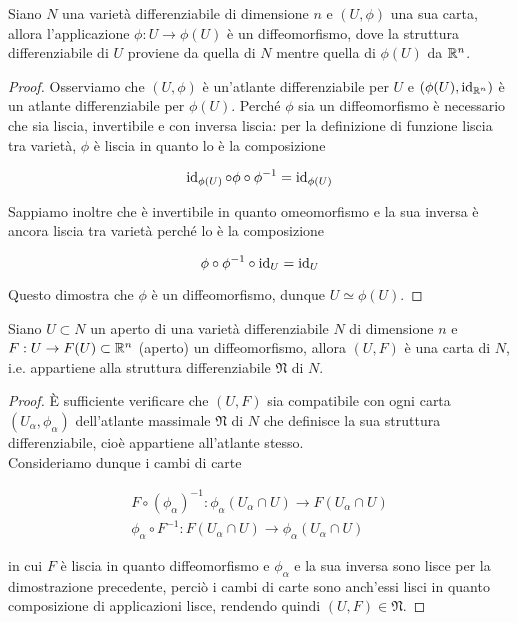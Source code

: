 \begin{definition}
	Siano $ N $ una varietà differenziabile di dimensione $ n $ e $ (U,\phi) $ una sua carta, allora l'applicazione $ \phi : U \to \phi(U) $ è un diffeomorfismo, dove la struttura differenziabile di $ U $ proviene da quella di $ N $ mentre quella di $ \phi(U) $ da $ \mathbb{R}^{n} $.
\end{definition}

\begin{proof}
	Osserviamo che $ (U,\phi) $ è un'atlante differenziabile per $ U $ e $ (\phi(U),\operatorname{id}_{\mathbb{R}^{n}}) $ è un atlante differenziabile per $ \phi(U) $. Perché $ \phi $ sia un diffeomorfismo è necessario che sia liscia, invertibile e con inversa liscia: per la definizione di funzione liscia tra varietà, $ \phi $ è liscia in quanto lo è la composizione
	
	\begin{equation}
		\operatorname{id}_{\phi(U)} \circ \phi \circ \phi^{-1} = \operatorname{id}_{\phi(U)}
	\end{equation}

	Sappiamo inoltre che è invertibile in quanto omeomorfismo e la sua inversa è ancora liscia tra varietà perché lo è la composizione
	
	\begin{equation}
		\phi \circ \phi^{-1} \circ \operatorname{id}_{U} = \operatorname{id}_{U}
	\end{equation}

	Questo dimostra che $ \phi $ è un diffeomorfismo, dunque $ U \simeq \phi(U) $.
\end{proof}

\begin{definition}\label{diffeo-map}
	Siano $ U \subset N $ un aperto di una varietà differenziabile $ N $ di dimensione $ n $ e $ F : U \to F(U) \subset \mathbb{R}^{n} $ (aperto) un diffeomorfismo, allora $ (U,F) $ è una carta di $ N $, i.e. appartiene alla struttura differenziabile $ \mathfrak{N} $ di $ N $.
\end{definition}

\begin{proof}
	\`{E} sufficiente verificare che $ (U,F) $ sia compatibile con ogni carta $ (U_{\alpha},\phi_{\alpha}) $ dell'atlante massimale $ \mathfrak{N} $ di $ N $ che definisce la sua struttura differenziabile, cioè appartiene all'atlante stesso.\\
	Consideriamo dunque i cambi di carte
	
	\begin{gather}
		F \circ (\phi_{\alpha})^{-1} : \phi_{\alpha}(U_{\alpha} \cap U) \to F(U_{\alpha} \cap U)\\
		\phi_{\alpha} \circ F^{-1} : F(U_{\alpha} \cap U) \to \phi_{\alpha}(U_{\alpha} \cap U)
	\end{gather}

	in cui $ F $ è liscia in quanto diffeomorfismo e $ \phi_{\alpha} $ e la sua inversa sono lisce per la dimostrazione precedente, perciò i cambi di carte sono anch'essi lisci in quanto composizione di applicazioni lisce, rendendo quindi $ (U,F) \in \mathfrak{N} $.
\end{proof}

